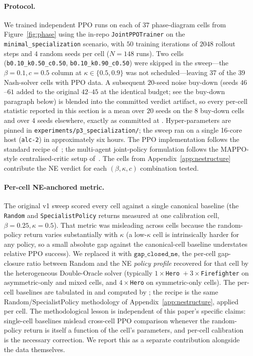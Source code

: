 \documentclass{anvil-paper}
\begin{document}
\paragraph{Protocol.}
We trained independent PPO runs on each of $37$ phase-diagram cells from
Figure~\ref{fig:phase} using the in-repo \texttt{JointPPOTrainer} on the
\texttt{minimal\_specialization} scenario, with $50$ training iterations of
$2048$ rollout steps and $4$ random seeds per cell ($N{=}148$ runs). Two
cells (\verb|b0.10_k0.50_c0.50|, \verb|b0.10_k0.90_c0.50|) were skipped in
the sweep---the $\beta{=}0.1,c{=}0.5$ column at $\kappa\in\{0.5,0.9\}$ was
not scheduled---leaving 37 of the 39 Nash-solver cells with PPO data. A
subsequent $20$-seed noise buy-down (seeds $46$--$61$ added to the original
$42$--$45$ at the identical budget; see the buy-down paragraph below) is
blended into the committed verdict artifact, so every per-cell statistic
reported in this section is a mean over $20$ seeds on the $8$ buy-down cells
and over $4$ seeds elsewhere, exactly as committed at
.
Hyper-parameters are pinned in \texttt{experiments/p3\_specialization/}; the
sweep ran on a single 16-core host (\texttt{alc-2}) in approximately six
hours. The PPO implementation follows the standard recipe
of~\citet{ppo2017}; the multi-agent joint-policy formulation follows the
MAPPO-style centralised-critic setup of~\citet{mappo2022}. The cells
from Appendix~\ref{app:nestructure} contribute the NE verdict for each
$(\beta,\kappa,c)$ combination tested.

\paragraph{Per-cell NE-anchored metric.}
The original v1 sweep scored every cell against a single canonical baseline
(the \texttt{Random} and \texttt{SpecialistPolicy} returns measured at one
calibration cell, $\beta{=}0.25,\kappa{=}0.5$). That metric was misleading
across cells because the random-policy return varies substantially with
$\kappa$ (a low-$\kappa$ cell is intrinsically harder for any policy, so a
small absolute gap against the canonical-cell baseline understates relative
PPO success). We replaced it with $\texttt{gap\_closed\_ne}$, the per-cell
gap-closure ratio between Random and the NE \emph{policy profile}
recovered for that cell by the heterogeneous Double-Oracle solver
(typically $1\times$\texttt{Hero}~$+~3\times$\texttt{Firefighter} on
asymmetric-only and mixed cells, and $4\times$\texttt{Hero} on
symmetric-only cells). The per-cell baselines are tabulated in
 and
computed by ; the recipe is
the same Random/SpecialistPolicy methodology of Appendix~\ref{app:nestructure},
applied per cell. The methodological lesson is independent of this paper's
specific claims: single-cell baselines mislead cross-cell PPO comparison
whenever the random-policy return is itself a function of the cell's
parameters, and per-cell calibration is the necessary correction. We report
this as a separate contribution alongside the data themselves.
\end{document}
